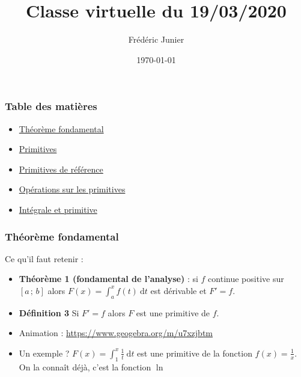 \documentclass[11pt, hyperref={urlcolor=red,%
            linkcolor=blue, %
            colorlinks=true}]{beamer}
\title[exponentielle]{Classe virtuelle du 19/03/2020}
\author[F.Junier]{Fr\'ed\'eric Junier}
\institute[Le Parc]{{\centering Lyc\'ee du Parc \\
1 Boulevard Anatole France \\ 69006 Lyon }}
\date[\today]{\today}
\newcommand{\Interff}[2]{\left[#1\, ;\, #2\right]}
\newcommand{\dt}{\ensuremath{\text{d}t}}		%
\newcommand{\integralet}[3]{\int_{#1}^{#2} #3 \ \dt}
\begin{document}
\frame{\titlepage}




\begin{frame}
\frametitle{Table des matières}
\begin{itemize}
	\item \hyperlink{fondamental}{Théorème fondamental}
	\item \hyperlink{primitives}{Primitives}
	\item \hyperlink{primref}{Primitives de référence}
	\item \hyperlink{primop}{Opérations sur les primitives}
	\item \hyperlink{integrale}{Intégrale et primitive}
\end{itemize}

\end{frame}

\begin{frame}
\frametitle{Théorème fondamental}
\label{fondmental}

Ce qu'il faut retenir :

\begin{itemize}

	\item \textbf{Théorème 1 (fondamental de l'analyse)} : si $f$ continue positive sur $\Interff{a}{b}$ alors $F(x)=\integralet{a}{x}{f(t)}$ est dérivable et $F'=f$.  
	\pause \item \textbf{Définition 3}  Si $F'=f$ alors $F$ est une primitive de $f$.
	\pause \item Animation : \href{https://www.geogebra.org/m/u7xzjbtm}{https://www.geogebra.org/m/u7xzjbtm}
	\pause \item Un exemple ?  $F(x)=\integralet{1}{x}{\frac{1}{t}}$ est une primitive de la fonction $f(x)=\frac{1}{x}$. On la connaît déjà, c'est la fonction $\ln$
	


\end{itemize}

\end{frame}
\end{document}
